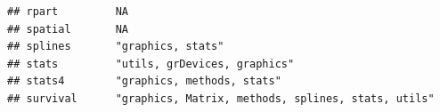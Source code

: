 \documentclass[]{article}
\begin{document}
\begin{verbatim}
## rpart         NA                                                                                                                                                                                                                                                                                                                                                                                                                                                                                    
## spatial       NA                                                                                                                                                                                                                                                                                                                                                                                                                                                                                    
## splines       "graphics, stats"                                                                                                                                                                                                                                                                                                                                                                                                                                                                     
## stats         "utils, grDevices, graphics"                                                                                                                                                                                                                                                                                                                                                                                                                                                          
## stats4        "graphics, methods, stats"                                                                                                                                                                                                                                                                                                                                                                                                                                                            
## survival      "graphics, Matrix, methods, splines, stats, utils"                                                                                                                                                                                                                                                                                                                                                                                                                                    

\end{verbatim}
\end{document}
